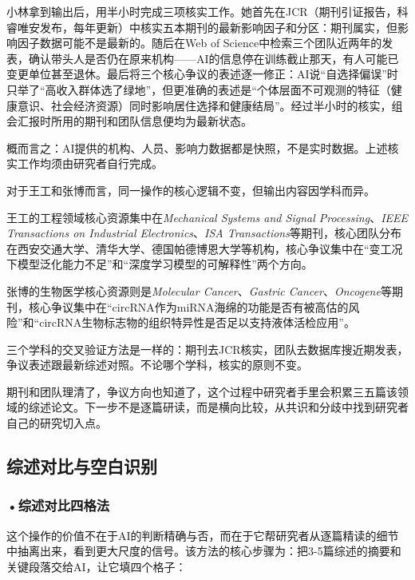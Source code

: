 \begin{critiquebox}
小林拿到输出后，用半小时完成三项核实工作。她首先在JCR（期刊引证报告，科睿唯安发布，每年更新）中核实五本期刊的最新影响因子和分区：期刊属实，但影响因子数据可能不是最新的。随后在Web of Science中检索三个团队近两年的发表，确认带头人是否仍在原来机构——AI的信息停在训练截止那天，有人可能已变更单位甚至退休。最后将三个核心争议的表述逐一修正：AI说``自选择偏误''时只举了``高收入群体选了绿地''，但更准确的表述是``个体层面不可观测的特征（健康意识、社会经济资源）同时影响居住选择和健康结局''。经过半小时的核实，组会汇报时所用的期刊和团队信息便均为最新状态。

概而言之：AI提供的机构、人员、影响力数据都是快照，不是实时数据。上述核实工作均须由研究者自行完成。
\end{critiquebox}

对于王工和张博而言，同一操作的核心逻辑不变，但输出内容因学科而异。

王工的工程领域核心资源集中在\textit{Mechanical Systems and Signal Processing}、\textit{IEEE Transactions on Industrial Electronics}、\textit{ISA Transactions}等期刊，核心团队分布在西安交通大学、清华大学、德国帕德博恩大学等机构，核心争议集中在``变工况下模型泛化能力不足''和``深度学习模型的可解释性''两个方向。

张博的生物医学核心资源则是\textit{Molecular Cancer}、\textit{Gastric Cancer}、\textit{Oncogene}等期刊，核心争议集中在``circRNA作为miRNA海绵的功能是否有被高估的风险''和``circRNA生物标志物的组织特异性是否足以支持液体活检应用''。

三个学科的交叉验证方法是一样的：期刊去JCR核实，团队去数据库搜近期发表，争议表述跟最新综述对照。不论哪个学科，核实的原则不变。

期刊和团队理清了，争议方向也知道了，这个过程中研究者手里会积累三五篇该领域的综述论文。下一步不是逐篇研读，而是横向比较，从共识和分歧中找到研究者自己的研究切入点。

\subsection{综述对比与空白识别}

\subsubsection*{\textbf{•综述对比四格法}}这个操作的价值不在于AI的判断精确与否，而在于它帮研究者从逐篇精读的细节中抽离出来，看到更大尺度的信号。该方法的核心步骤为：把3-5篇综述的摘要和关键段落交给AI，让它填四个格子：

